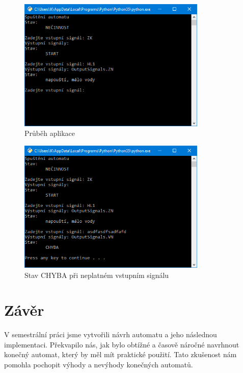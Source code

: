 \documentclass[12pt]{report}
\begin{document}
\begin{figure}[h]
		\centering
		\includegraphics[width=0.8\textwidth]{./images/app_progress.png}	
		\caption{Průběh aplikace}
\end{figure}

\begin{figure}[h]
		\centering
		\includegraphics[width=0.8\textwidth]{./images/app_error.png}	
		\caption{Stav CHYBA při neplatném vstupním signálu}
\end{figure}

\chapter{Závěr}
V semestrální práci jsme vytvořili návrh automatu a jeho následnou implementaci.
Překvapilo nás, jak bylo obtížné a časově náročné navrhnout konečný automat, který by měl mít praktické použití. Tato zkušenost nám pomohla pochopit výhody a nevýhody konečných automatů.
\end{document}
